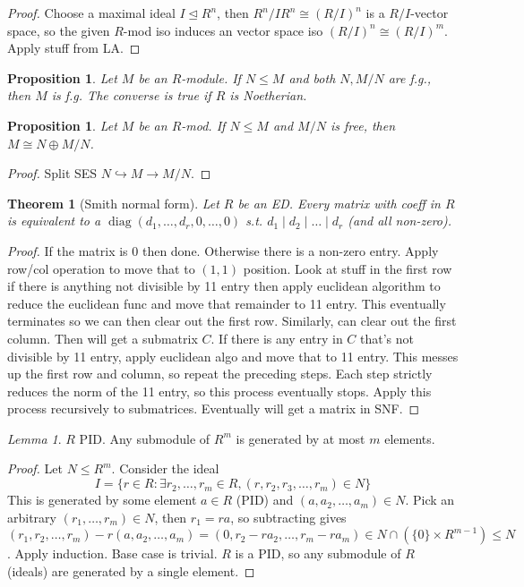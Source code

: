 \documentclass{article}
\theoremstyle{definition}
\theoremstyle{remark}
\newtheorem{lem}[defn]{Lemma}
\theoremstyle{plain}
\newtheorem{thm}[defn]{Theorem}
\newtheorem{prop}[defn]{Proposition}
\theoremstyle{definition}
\begin{document}
\begin{proof}
    Choose a maximal ideal $I\trianglelefteq R^n$, then $R^n/IR^n\cong (R/I)^n$ is a $R/I$-vector space, so the given $R$-mod iso induces an vector space iso $(R/I)^n\cong(R/I)^m$. Apply stuff from LA.
\end{proof}
\begin{prop}
    Let $M$ be an $R$-module. If $N\le M$ and both $N, M/N$ are f.g., then $M$ is f.g. The converse is true if $R$ is Noetherian. 
\end{prop}
\begin{prop}
    Let $M$ be an $R$-mod. If $N\le M$ and $M/N$ is free, then $M\cong N\oplus M/N$.
\end{prop}
\begin{proof}
    Split SES $N\hookrightarrow M\rightarrow M/N$.
\end{proof}
\begin{thm}[Smith normal form]
    Let $R$ be an ED. Every matrix with coeff in $R$ is equivalent to a $\operatorname{diag}(d_1,\ldots,d_r,0,\ldots,0)$ s.t. $d_1\mid d_2\mid\ldots\mid d_r$ (and all non-zero).
\end{thm}
\begin{proof}
    If the matrix is $0$ then done. Otherwise there is a non-zero entry. Apply row/col operation to move that to $(1,1)$ position. Look at stuff in the first row if there is anything not divisible by 11 entry then apply euclidean algorithm to reduce the euclidean func and move that remainder to 11 entry. This eventually terminates so we can then clear out the first row. Similarly, can clear out the first column. Then will get a submatrix $C$. If there is any entry in $C$ that's not divisible by 11 entry, apply euclidean algo and move that to 11 entry. This messes up the first row and column, so repeat the preceding steps. Each step strictly reduces the norm of the 11 entry, so this process eventually stops. Apply this process recursively to submatrices. Eventually will get a matrix in SNF.
\end{proof}
\begin{lem}
    $R$ PID. Any submodule of $R^m$ is generated by at most $m$ elements.
\end{lem}
\begin{proof}
    Let $N\le R^m$.
    Consider the ideal
    \[I=\{r\in R:\exists r_2,\ldots, r_{m}\in R,(r,r_2,r_3,\ldots,r_{m})\in N\}\]
    This is generated by some element $a\in R$ (PID) and $(a,a_2,\ldots,a_m)\in N$. Pick an arbitrary $(r_1,\ldots, r_m)\in N$, then $r_1=ra$, so subtracting gives $(r_1,r_2,\ldots,r_m)-r(a,a_2,\ldots,a_m)=(0,r_2-ra_2,\ldots,r_m-ra_m)\in N\cap(\{0\}\times R^{m-1})\le N$. Apply induction. Base case is trivial. $R$ is a PID, so any submodule of $R$ (ideals) are generated by a single element.
\end{proof}
\end{document}
